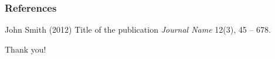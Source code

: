 \documentclass{beamer}
\begin{document}
\begin{frame}
\frametitle{References}
\footnotesize{
\begin{thebibliography}{99} %
 John Smith (2012)
\newblock Title of the publication
\newblock \emph{Journal Name} 12(3), 45 -- 678.
\end{thebibliography}
}
\end{frame}


\begin{frame}
\Huge{\centerline{Thank you!}}
\end{frame}

\end{document}
